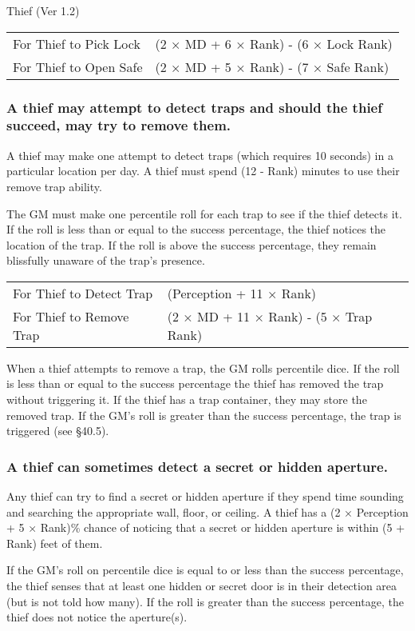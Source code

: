 \begin{Chapter}{Thief (Ver 1.2)}
\begin{tabularx}{\columnwidth}{XX}
For Thief to Pick Lock & (2 × MD + 6 × Rank)  - (6 × Lock Rank) \\
For Thief to Open Safe & (2 × MD + 5 × Rank)  - (7 × Safe Rank) \\
\end{tabularx}

\subsubsection{A thief may attempt to detect traps and should the thief succeed, may
try to remove them.}

A thief may make one attempt to detect traps (which requires 10
seconds) in a particular location per day. A thief must spend (12 -
Rank) minutes to use their remove trap ability.

The GM must make one percentile roll for each trap to see if the thief
detects it.  If the roll is less than or equal to the success
percentage, the thief notices the location of the trap. If the roll is
above the success percentage, they remain blissfully unaware of the
trap’s presence.

\begin{tabularx}{\columnwidth}{XX}
For Thief to Detect Trap  & (Perception + 11 × Rank) \\
For Thief to Remove Trap  & (2 × MD + 11 × Rank)  - (5 × Trap Rank) \\
\end{tabularx}

When a thief attempts to remove a trap, the GM rolls percentile
dice. If the roll is less than or equal to the success percentage the
thief has removed the trap without triggering it.  If the thief has a
trap container, they may store the removed trap.  If the GM’s roll is
greater than the success percentage, the trap is triggered (see
§40.5).

\subsubsection{A thief can sometimes detect a secret or hidden aperture.}

Any thief can try to find a secret or hidden aperture if they spend
time sounding and searching the appropriate wall, floor, or ceiling.
A thief has a (2 × Perception + 5 × Rank)\% chance of noticing that a
secret or hidden aperture is within (5 + Rank) feet of them.

If the GM’s roll on percentile dice is equal to or less than the
success percentage, the thief senses that at least one hidden or
secret door is in their detection area (but is not told how many).  If
the roll is greater than the success percentage, the thief does not
notice the aperture(s).


\end{Chapter}

